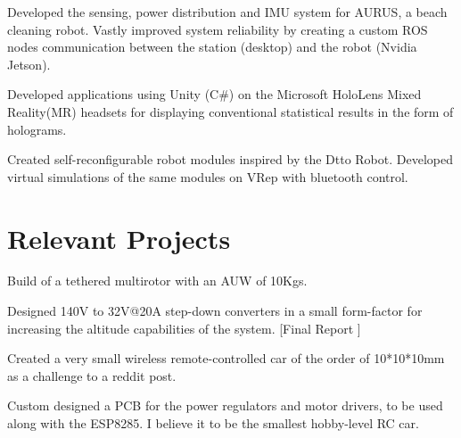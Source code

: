 \documentclass[]{deedy-resume-openfont}
\begin{document}
\begin{minipage}[t]{0.66\textwidth}
\sectionsep


Developed the sensing, power distribution and IMU system for AURUS, a beach cleaning robot. Vastly improved system reliability by creating a custom ROS nodes communication between the station (desktop) and the robot (Nvidia Jetson).

\sectionsep


Developed applications using Unity (C\#) on the Microsoft HoloLens Mixed Reality(MR) headsets for displaying conventional statistical results in the form of holograms.

\sectionsep


Created self-reconfigurable robot modules inspired by the Dtto Robot. Developed virtual simulations of the same modules on VRep with bluetooth control.

\sectionsep


\end{minipage} 

\newpage



\section{Relevant Projects}

\begin{tightemize}
	\item Build of a tethered multirotor with an AUW of 10Kgs.
	\item Designed 140V to 32V@20A step-down converters in a small form-factor for increasing the altitude capabilities of the system. [Final Report \href{http://bit.ly/ATLAS-Report}{ \faExternalLink}]
\end{tightemize}
\sectionsep

\begin{tightemize}
	\item Created a very small wireless remote-controlled car of the order of 10*10*10mm as a challenge to a reddit post.
	\item Custom designed a PCB for the power regulators and motor drivers, to be used along with the ESP8285. I believe it to be the smallest hobby-level RC car. 
\end{tightemize}
\sectionsep
\end{document}

